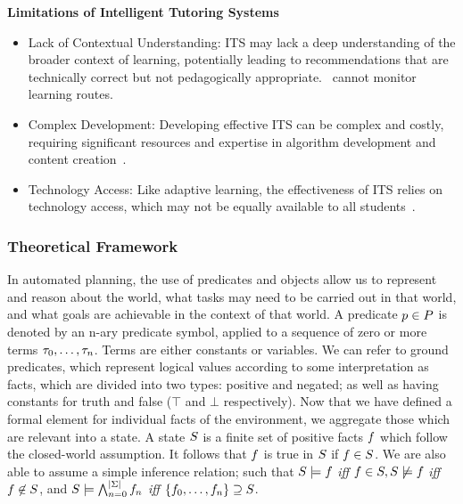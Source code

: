 \textbf{Limitations of Intelligent Tutoring Systems}
\begin{itemize}
    \item Lack of Contextual Understanding: ITS may lack a deep understanding of the broader context of learning, potentially leading to recommendations that are technically correct but not pedagogically appropriate.~\citet{Garrido2009} cannot monitor learning routes.
    
    \item Complex Development: Developing effective ITS can be complex and costly, requiring significant resources and expertise in algorithm development and content creation~\cite{Corbett1997}.
    
    \item Technology Access: Like adaptive learning, the effectiveness of ITS relies on technology access, which may not be equally available to all students~\cite{Kabudi2021}.
\end{itemize}

\subsubsection{Theoretical Framework} 
In automated planning, the use of predicates and objects allow us to represent and reason about the world, what tasks may need to be carried out in that world, and what goals are achievable in the context of that world.
A predicate $p\in P$ is denoted by an n-ary predicate symbol, applied to a sequence of zero or more terms $\tau_0,\dots,\tau_n$. Terms are either constants or variables. We can refer to ground predicates, which represent logical values according to some interpretation as facts, which are divided into two types: positive and negated; as well as having constants for truth and false ($\top$ and $\bot$ respectively).
Now that we have defined a formal element for individual facts of the environment, we aggregate those which are relevant into a state.
A state $S$ is a finite set of positive facts $f$ which follow the closed-world assumption. It follows that $f$ is true in $S$ if $f\in S$. We are also able to assume a simple inference relation; such that $S\models f$ \textit{iff} $f\in S,S\not\models f$ \textit{iff} $f\not\in S$, and $S\models\bigwedge^{\left\lvert \Sigma \right\rvert}_{n=0}f_n$ \textit{iff} $\left\{f_0,\dots,f_n\right\}\supseteq S$.

